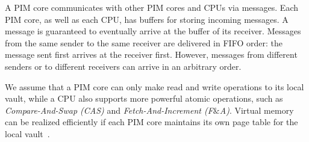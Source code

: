 A PIM core communicates with other PIM cores and CPUs via messages.
Each PIM core, as well as each CPU, has buffers for storing incoming messages.
A message is guaranteed to eventually arrive at the buffer of its receiver.
Messages from the same sender to the same receiver are delivered in FIFO order: 
the message sent first arrives at the receiver first. 
However, messages from different senders or to different receivers can arrive in an arbitrary order. 

We assume that a PIM core can only make read and write operations 
to its local vault, while a CPU also supports more powerful atomic operations, such as \emph{Compare-And-Swap (CAS)} 
and \emph{Fetch-And-Increment (F$\&$A)}.
Virtual memory can be realized efficiently if  
each PIM core maintains its own page table for the local vault~\cite{hsieh2016accelerating}.